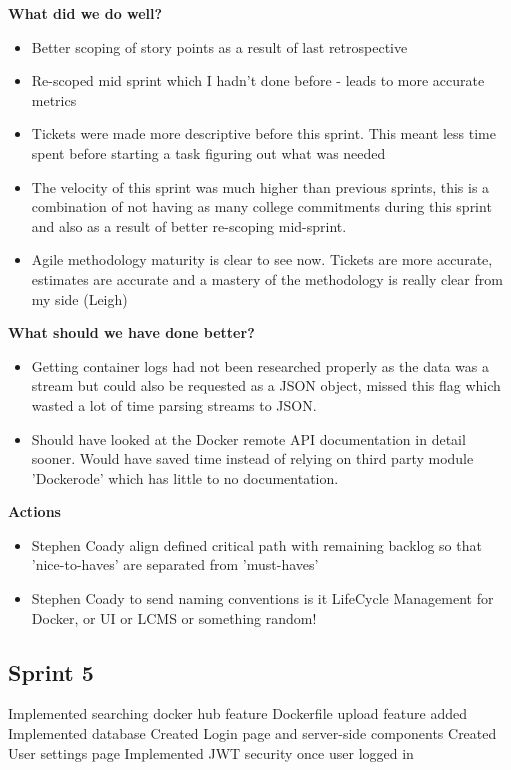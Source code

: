 \textbf{What did we do well?}
\begin{itemize}
	\item Better scoping of story points as a result of last retrospective
	\item Re-scoped mid sprint which I hadn't done before - leads to more accurate metrics
	\item Tickets were made more descriptive before this sprint. This meant less time spent before starting a task figuring out what was needed
	\item The velocity of this sprint was much higher than previous sprints, this is a combination of not having as many college commitments during this sprint and also as a result of better re-scoping mid-sprint.
	\item Agile methodology maturity is clear to see now. Tickets are more accurate, estimates are accurate and a mastery of the methodology is really clear from my side (Leigh)
\end{itemize}
\textbf{What should we have done better?}
\begin{itemize}
	\item Getting container logs had not been researched properly as the data was a stream but could also be requested as a JSON object, missed this flag which wasted a lot of time parsing streams to JSON.
	\item Should have looked at the Docker remote API documentation in detail sooner. Would have saved time instead of relying on third party module 'Dockerode' which has little to no documentation.
\end{itemize}

\textbf{Actions}
\begin{itemize}
	\item Stephen Coady align defined critical path with remaining backlog so that 'nice-to-haves' are separated from 'must-haves'
	\item Stephen Coady to send naming conventions is it LifeCycle Management for Docker, or UI or LCMS or something random!
\end{itemize}

\subsection{Sprint 5}
Implemented searching docker hub feature
Dockerfile upload feature added
Implemented database
Created Login page and server-side components
Created User settings page
Implemented JWT security once user logged in

